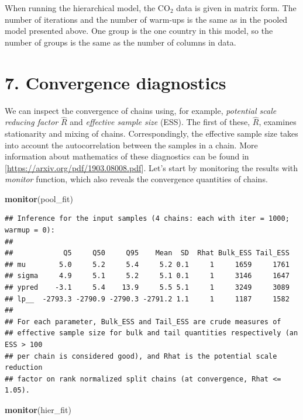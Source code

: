 \documentclass[
]{article}
\newenvironment{Shaded}{\begin{snugshade}}{\end{snugshade}}
\newcommand{\KeywordTok}[1]{\textcolor[rgb]{0.13,0.29,0.53}{\textbf{#1}}}
\newcommand{\NormalTok}[1]{#1}
\begin{document}
When running the hierarchical model, the CO\(_2\) data is given in
matrix form. The number of iterations and the number of warm-ups is the
same as in the pooled model presented above. One group is the one
country in this model, so the number of groups is the same as the number
of columns in data.

\hypertarget{convergence-diagnostics}{%
\section{7. Convergence diagnostics}\label{convergence-diagnostics}}

We can inspect the convergence of chains using, for example,
\emph{potential scale reducing factor} \(\hat{R}\) and
\emph{effective sample size} (ESS). The first of these, \(\hat{R}\),
examines stationarity and mixing of chains. Correspondingly, the
effective sample size takes into account the autocorrelation between the
samples in a chain. More information about mathematics of these
diagnostics can be found in
{[}\url{https://arxiv.org/pdf/1903.08008.pdf}{]}. Let's start by
monitoring the results with \emph{monitor} function, which also reveals
the convergence quantities of chains.

\begin{Shaded}
\begin{Highlighting}[]
\KeywordTok{monitor}\NormalTok{(pool\_fit)}
\end{Highlighting}
\end{Shaded}

\begin{verbatim}
## Inference for the input samples (4 chains: each with iter = 1000; warmup = 0):
## 
##            Q5     Q50     Q95    Mean  SD  Rhat Bulk_ESS Tail_ESS
## mu        5.0     5.2     5.4     5.2 0.1     1     1659     1761
## sigma     4.9     5.1     5.2     5.1 0.1     1     3146     1647
## ypred    -3.1     5.4    13.9     5.5 5.1     1     3249     3089
## lp__  -2793.3 -2790.9 -2790.3 -2791.2 1.1     1     1187     1582
## 
## For each parameter, Bulk_ESS and Tail_ESS are crude measures of 
## effective sample size for bulk and tail quantities respectively (an ESS > 100 
## per chain is considered good), and Rhat is the potential scale reduction 
## factor on rank normalized split chains (at convergence, Rhat <= 1.05).
\end{verbatim}

\begin{Shaded}
\begin{Highlighting}[]
\KeywordTok{monitor}\NormalTok{(hier\_fit)}
\end{Highlighting}
\end{Shaded}
\end{document}
